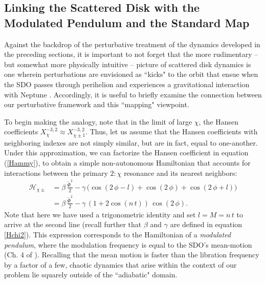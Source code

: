 \documentclass[twocolumn]{aastex62}
\newcommand{\Ham}{\mathcal{H}}
\begin{document}




\subsection{Linking the Scattered Disk with the Modulated Pendulum and the Standard Map} \label{sec:standard}
Against the backdrop of the perturbative treatment of the dynamics developed in the preceding sections, it is important to not forget that the more rudimentary -- but somewhat more physically intuitive -- picture of scattered disk dynamics is one wherein perturbations are envisioned as ``kicks" to the orbit that ensue when the SDO passes through perihelion and experiences a gravitational interaction with Neptune \citep{2004AJ....128.1418P, 2013Icar..222...20F}. Accordingly, it is useful to briefly examine the connection between our perturbative framework and this ``mapping" viewpoint.%

To begin making the analogy, note that in the limit of large $\chi$, the Hansen coefficients $X_{\chi}^{-3,2}\approx X_{\chi \pm 1}^{-3,2}$. Thus, let us assume that the Hansen coefficients with neighboring indexes are not simply similar, but are in fact, equal to one-another. Under this approximation, we can factorize the Hansen coefficient in equation (\ref{Hammy}), to obtain a simple non-autonomous Hamiltonian that accounts for interactions between the primary $2:\chi$ resonance and its nearest neighbors:
\begin{align}
\Ham_{\chi\pm}&=\beta\,\frac{\tilde{\Phi}^2}{2}-\gamma\,\big( \cos(2\,\phi-l)+\cos(2\,\phi)+\cos(2\,\phi+l)\big)\nonumber \\
&=\beta\,\frac{\tilde{\Phi}^2}{2}-\gamma\,(1+2\cos(n\,t)) \,\cos(2\,\phi).
\label{modpend}
\end{align}
Note that here we have used a trigonometric identity and set $l=M=n\,t$ to arrive at the second line (recall further that $\beta$ and $\gamma$ are defined in equation \ref{Hchi2}). This expression corresponds to the Hamiltonian of a \textit{modulated pendulum}, where the modulation frequency is equal to the SDO's mean-motion (Ch. 4 of \citealt{Morbybook}). Recalling that the mean motion is faster than the libration frequency by a factor of a few, chaotic dynamics that arise within the context of our problem lie squarely outside of the ``adiabatic" domain.
\end{document}
